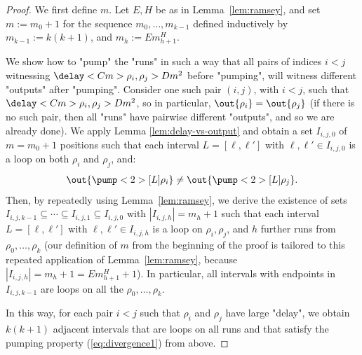 \documentclass{theoretics}
\begin{document}
\begin{proof}
We first define $m$. %
Let $E,H$ be as in Lemma~\ref{lem:ramsey}, and set $m:=m_0+1$ for 
the sequence $m_0, \ldots, m_{k-1}$ defined inductively by 
$m_{k-1} := k(k+1)$, and 
$m_h := E m_{h+1}^H$. 

We show how to "pump" the "runs" in such a way that all pairs of indices $i<j$
witnessing $\delay<C m>{\rho_i,\rho_j} > D m^2$ before "pumping",
will witness different "outputs" after "pumping".
Consider one such pair $(i,j)$, with $i<j$, such that 
$\delay<C m>{\rho_i,\rho_j} > D m^2$, so in particular,
$\out{\rho_i} = \out{\rho_j}$
(if there is no such pair, then all "runs" have pairwise different
"outputs", and so we are already done).
We apply Lemma \ref{lem:delay-vs-output}
and obtain a set $I_{i,j,0}$ of $m = m_0+1$ positions such that each interval $L=[\ell,\ell']$ with $\ell,\ell' \in I_{i,j,0}$ is a loop on both $\rho_i$ and $\rho_j$, and:
\begin{equation}\label{eq:divergence1}
  \out{\pump<2>[L]{\rho_i}} \neq \out{\pump<2>[L]{\rho_j}}.
\end{equation}
Then, by repeatedly using Lemma~\ref{lem:ramsey}, 
we derive the existence of sets $I_{i,j,k-1} \subseteq  \cdots \subseteq I_{i,j,1} \subseteq I_{i,j,0}$ with $|I_{i,j,h}| = m_h+1$ such that each interval $L=[\ell,\ell']$ with $\ell,\ell' \in I_{i,j,h}$ is a loop on $\rho_i,\rho_j$, and $h$ further runs from $\rho_0,\ldots,\rho_k$ (our definition of $m$ from the 
beginning of the proof is tailored to this repeated application
of Lemma~\ref{lem:ramsey}, because $|I_{i,j,h}| = m_h+1 = E m_{h+1}^H +1$). In particular, all intervals with endpoints in $I_{i,j,k-1}$ are loops on all the $\rho_0,\ldots,\rho_k$.

In this way, for each pair $i<j$ such that $\rho_i$ and $\rho_j$ 
have large "delay", we obtain $k(k+1)$ adjacent intervals that are loops on all runs and that satisfy the pumping property (\ref{eq:divergence1}) from above.


\end{proof}
\end{document}
